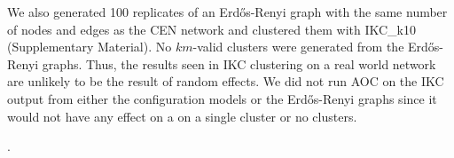 \documentclass[12pt, oneside]{article}   	%
\begin{document}
We also generated 100 replicates of an Erd\H{o}s-Renyi graph with the same number of nodes and edges as the CEN network and clustered them with IKC\_k10 (Supplementary Material). No $km$-valid clusters were generated from the Erd\H{o}s-Renyi graphs. Thus, the results seen in IKC clustering on a real world network are unlikely to be the result of random effects. We did not run AOC on the IKC output from either the configuration models or the Erd\H{o}s-Renyi graphs since it would not have any effect on a on a single cluster or no clusters.

. 

\end{document}
